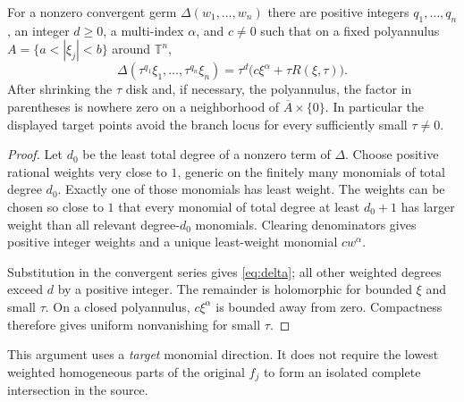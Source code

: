 \documentclass[11pt,letterpaper]{article}
\theoremstyle{definition}
\theoremstyle{remark}
\newcommand{\T}{\mathbb T}\newcommand{\D}{\mathbb D}
\numberwithin{equation}{section}
\begin{document}
\begin{lemma}\label{lem:weights}
For a nonzero convergent germ $\Delta(w_1,\ldots,w_n)$ there are positive
integers $q_1,\ldots,q_n$, an integer $d\geq0$, a multi-index $\alpha$, and
$c\ne0$ such that on a fixed polyannulus
$A=\{a<|\xi_j|<b\}$ around $\T^n$,
\begin{equation}\label{eq:delta}
 \Delta(\tau^{q_1}\xi_1,\ldots,\tau^{q_n}\xi_n)
 =\tau^d\bigl(c\xi^\alpha+\tau R(\xi,\tau)\bigr).
\end{equation}
After shrinking the $\tau$ disk and, if necessary, the polyannulus, the factor
in parentheses is nowhere zero on a neighborhood of
$\overline A\times\{0\}$. In particular the displayed target points avoid
the branch locus for every sufficiently small $\tau\ne0$.
\end{lemma}
\begin{proof}
Let $d_0$ be the least total degree of a nonzero term of $\Delta$. Choose
positive rational weights very close to $1$, generic on the finitely many
monomials of total degree $d_0$. Exactly one of those monomials has least
weight. The weights can be chosen so close to $1$ that every monomial of total
degree at least $d_0+1$ has larger weight than all relevant degree-$d_0$
monomials. Clearing denominators gives positive integer weights and a unique
least-weight monomial $c w^\alpha$.

Substitution in the convergent series gives \eqref{eq:delta}; all other
weighted degrees exceed $d$ by a positive integer. The remainder is
holomorphic for bounded $\xi$ and small $\tau$. On a closed polyannulus,
$c\xi^\alpha$ is bounded away from zero. Compactness therefore gives uniform
nonvanishing for small $\tau$.
\end{proof}

This argument uses a \emph{target} monomial direction. It does not require the
lowest weighted homogeneous parts of the original $f_j$ to form an isolated
complete intersection in the source.
\end{document}
